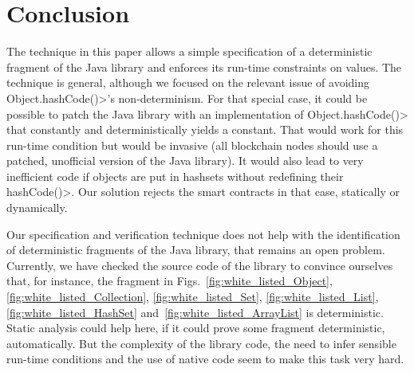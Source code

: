 \section{Conclusion}\label{sec:conclusion}

The technique in this paper allows a simple
specification of a deterministic fragment of the Java library and
enforces its run-time constraints on values.
The technique is general, although we focused on the
relevant issue of avoiding \<Object.hashCode()>'s non-determinism.
For that special case, it could be possible to patch the Java library
with an implementation of \<Object.hashCode()> that constantly and
deterministically yields a constant. That would work for this run-time condition
but would be invasive (all blockchain nodes should use a patched,
unofficial version of the Java library). It would also lead to very inefficient
code if objects are put in hashsets without redefining their \<hashCode()>.
Our solution rejects the smart contracts in that case, statically or dynamically.

Our specification and verification technique does not help with the
identification of deterministic fragments of the Java library, that remains
an open problem. Currently,
we have checked the source code of the library to convince ourselves that,
for instance, the fragment in Figs.~\ref{fig:white_listed_Object}, \ref{fig:white_listed_Collection},
\ref{fig:white_listed_Set}, \ref{fig:white_listed_List},
\ref{fig:white_listed_HashSet} and~\ref{fig:white_listed_ArrayList} is deterministic.
Static analysis could help here, if it could prove some fragment deterministic,
automatically. But the complexity of the library code, the need to infer
sensible run-time conditions and the use of native code seem to make this task very hard.
